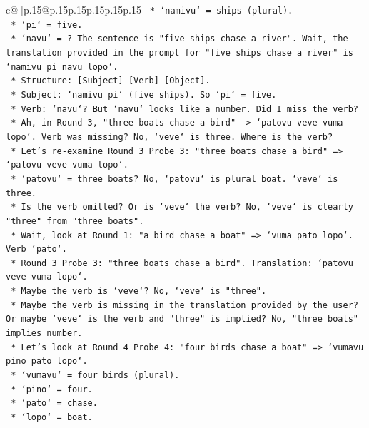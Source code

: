 \documentclass{article}
\begin{document}
{\begin{supertabular}{c@{$\;$}|p{.15\linewidth}@{}p{.15\linewidth}p{.15\linewidth}p{.15\linewidth}p{.15\linewidth}p{.15\linewidth}}
{{{\texttt{            *   `namivu` = ships (plural).} \\
\texttt{            *   `pi` = five.} \\
\texttt{            *   `navu` = ? The sentence is "five ships chase a river". Wait, the translation provided in the prompt for "five ships chase a river" is `namivu pi navu lopo`.} \\
\texttt{            *   Structure: {[}Subject{]} {[}Verb{]} {[}Object{]}.} \\
\texttt{            *   Subject: `namivu pi` (five ships). So `pi` = five.} \\
\texttt{            *   Verb: `navu`? But `navu` looks like a number. Did I miss the verb?} \\
\texttt{            *   Ah, in Round 3, "three boats chase a bird" {-}> `patovu veve vuma lopo`. Verb was missing? No, `veve` is three. Where is the verb?} \\
\texttt{            *   Let's re{-}examine Round 3 Probe 3: "three boats chase a bird" => `patovu veve vuma lopo`.} \\
\texttt{                *   `patovu` = three boats? No, `patovu` is plural boat. `veve` is three.} \\
\texttt{                *   Is the verb omitted? Or is `veve` the verb? No, `veve` is clearly "three" from "three boats".} \\
\texttt{                *   Wait, look at Round 1: "a bird chase a boat" => `vuma pato lopo`. Verb `pato`.} \\
\texttt{                *   Round 3 Probe 3: "three boats chase a bird". Translation: `patovu veve vuma lopo`.} \\
\texttt{                *   Maybe the verb is `veve`? No, `veve` is "three".} \\
\texttt{                *   Maybe the verb is missing in the translation provided by the user? Or maybe `veve` is the verb and "three" is implied? No, "three boats" implies number.} \\
\texttt{                *   Let's look at Round 4 Probe 4: "four birds chase a boat" => `vumavu pino pato lopo`.} \\
\texttt{                    *   `vumavu` = four birds (plural).} \\
\texttt{                    *   `pino` = four.} \\
\texttt{                    *   `pato` = chase.} \\
\texttt{                    *   `lopo` = boat.} \\
}}}
\end{supertabular}}
\end{document}
